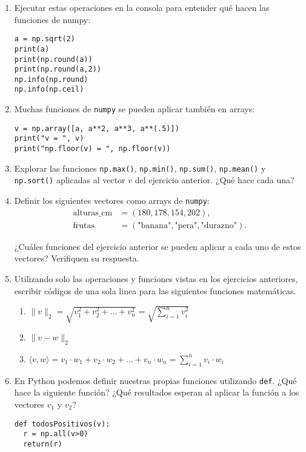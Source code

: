 \documentclass[a4paper,11pt]{article}
\theoremstyle{definition}
\begin{document}
\begin{enumerate}[resume]
\item Ejecutar estas operaciones en la consola para entender qué hacen las funciones de numpy:
\begin{lstlisting}
a = np.sqrt(2)
print(a)
print(np.round(a))
print(np.round(a,2))
np.info(np.round)
np.info(np.ceil)
\end{lstlisting}

\item Muchas funciones de \lstinline{numpy} se pueden aplicar también en arrays:
\begin{lstlisting}
v = np.array([a, a**2, a**3, a**(.5)])
print("v = ", v)
print("np.floor(v) = ", np.floor(v))
\end{lstlisting}

\item Explorar las funciones \lstinline{np.max()}, \lstinline{np.min()}, \lstinline{np.sum()}, \lstinline{np.mean()} y \lstinline{np.sort()} aplicadas al vector $v$ del ejercicio anterior. ¿Qué hace cada una?

\item Definir los siguientes vectores como arrays de \lstinline{numpy}:
\begin{align*}
\text{alturas\_cm} &= (180, 178, 154, 202), \\
\text{frutas} &= (\text{"banana"}, \text{"pera"}, \text{"durazno"}).
\end{align*}

¿Cuáles funciones del ejercicio anterior se pueden aplicar a cada uno de estos vectores? Verifiquen su respuesta.


\item Utilizando solo las operaciones y funciones vistas en los ejercicios anteriores, escribir códigos de una sola linea para las siguientes funciones matemáticas.
\begin{enumerate}
\item $\|v\|_2 = \sqrt{v_1^2 + v_2^2 + \dots + v_n^2} = \sqrt{\sum_{i=1}^n v_i^2}$
\item $\|v - w\|_2$
\item $\langle v, w\rangle = v_1 \cdot w_1 + v_2 \cdot w_2 + \dots + v_n \cdot w_n = \sum_{i=1}^n v_i \cdot w_i$
\end{enumerate}

\item En Python podemos definir nuestras propias funciones utilizando \lstinline{def}. ¿Qué hace la siguiente función? ¿Qué resultados esperan al aplicar la función a los vectores $v_1$ y $v_2$?
\begin{lstlisting}
def todosPositivos(v):
  r = np.all(v>0)
  return(r)


\end{lstlisting}
\end{enumerate}
\end{document}
